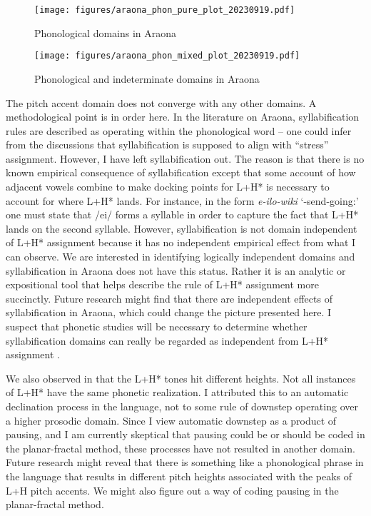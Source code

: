\documentclass[output=paper,hidelinks]{langscibook}
\begin{document}
\begin{figure}
    \texttt{[image: figures/araona\_phon\_pure\_plot\_20230919.pdf]}
    \caption{Phonological domains in Araona}
    \label{fig:phonologicaldomains}
\end{figure}

\begin{figure}
    \texttt{[image: figures/araona\_phon\_mixed\_plot\_20230919.pdf]}
    \caption{Phonological and indeterminate domains in Araona}
    \label{fig:phonologicaldomains2}
\end{figure}

\hspace*{-.2pt}The pitch accent domain does not converge with any other domains. A methodological point is in order here. In the literature on Araona, syllabification rules are described as operating within the phonological word -- one could infer from the discussions that syllabification is supposed to align with ``stress'' assignment. However, I have left syllabification out. The reason is that there is no known empirical consequence of syllabification except that some account of how adjacent vowels combine to make docking points for L+H* is necessary to account for where L+H* lands. For instance, in the form \textit{e-ilo-wiki} `\E{}-send-going:\Parg{}' one must state that /ei/ forms a syllable in order to capture the fact that L+H* lands on the second syllable. However, syllabification is not domain independent of L+H* assignment because it has no independent empirical effect from what I can observe. We are interested in identifying logically independent domains and syllabification in Araona does not have this status. Rather it is an analytic or expositional tool that helps describe the rule of L+H* assignment more succinctly. Future research might find that there are independent effects of syllabification in Araona, which could change the picture presented here. I suspect that phonetic studies will be necessary to determine whether syllabification domains can really be regarded as independent from L+H* assignment \citep{Fougeron1999}.

We also observed in  that the L+H* tones hit different heights. Not all instances of L+H* have the same phonetic realization. I attributed this to an automatic declination process in the language, not to some rule of downstep operating over a higher prosodic domain. Since I view automatic downstep as a product of pausing, and I am currently skeptical that pausing could be or should be coded in the planar-fractal method, these processes have not resulted in another domain. Future research might reveal that there is something like a phonological phrase in the language that results in different pitch heights associated with the peaks of L+H pitch accents. We might also figure out a way of coding pausing in the planar-fractal method.
\end{document}

